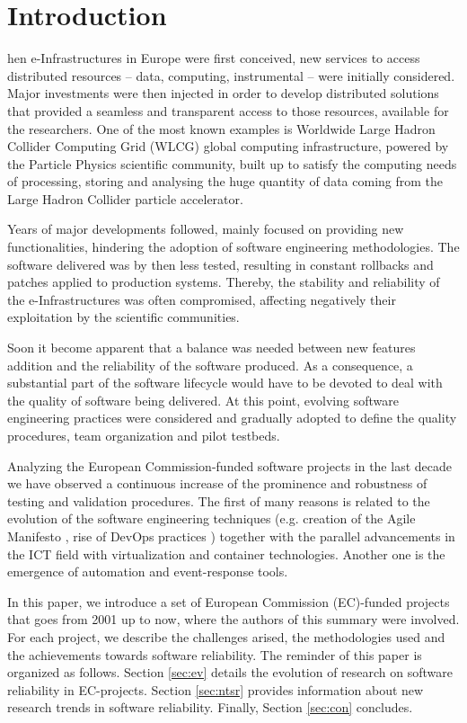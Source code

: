\documentclass[journal]{IEEEtran}
\begin{document}
\section{Introduction}

hen e-Infrastructures in Europe were first conceived, new
services to access distributed resources -- data, computing, instrumental --
were initially considered. Major investments were then injected in order to
develop distributed solutions that provided a seamless and transparent access
to those resources, available for the researchers. One of the most known examples is Worldwide
Large Hadron Collider Computing Grid (WLCG) global computing infrastructure, powered by the
Particle Physics scientific community, built up to satisfy the computing needs
of processing, storing and analysing the huge quantity of data coming from the Large Hadron
Collider particle accelerator.

Years of major developments followed, mainly focused on providing new
functionalities, hindering the adoption of software engineering methodologies.
The software delivered was by then less tested, resulting in constant
rollbacks and patches applied to production systems. Thereby, the stability and
reliability of the e-Infrastructures was often compromised, affecting
negatively their exploitation by the scientific communities.

Soon it become apparent that a balance was needed between new features addition
and the reliability of the software produced. As a consequence, a substantial part of the
software lifecycle would have to be devoted to deal with the quality of software being
delivered. At this point, evolving software engineering practices were
considered and gradually adopted to define the quality procedures, team
organization and pilot testbeds.

Analyzing the European Commission-funded software projects in the last decade
we have observed a continuous increase of the prominence and robustness of
testing and validation procedures. The first of many reasons is related to the
evolution of the software engineering techniques (e.g. creation of the Agile
Manifesto \cite{agile-manifesto}, rise of DevOps practices \cite{zhu}) together
with the parallel advancements in the ICT field with virtualization and
container technologies. Another one is the emergence of automation and
event-response tools.

In this paper, we introduce a set of European Commission (EC)-funded projects
that goes from 2001 up to now, where the authors of this summary were involved.
For each project, we describe the challenges arised, the methodologies used and
the achievements towards software reliability. The reminder of this paper is
organized as follows. Section \ref{sec:ev} details the evolution of research on
software reliability in EC-projects. Section \ref{sec:ntsr} provides
information about new research trends in software reliability. Finally,
Section \ref{sec:con} concludes.
\end{document}
